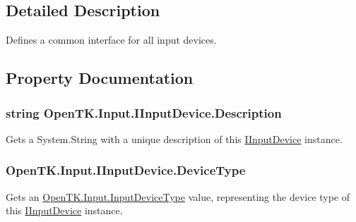 \subsection{Detailed Description}
Defines a common interface for all input devices. 



\subsection{Property Documentation}
\hypertarget{interface_open_t_k_1_1_input_1_1_i_input_device_ae119526b3cf39957b3f0440cf50122f2}{
\subsubsection[{Description}]{\setlength{\rightskip}{0pt plus 5cm}string Open\-T\-K.\-Input.\-I\-Input\-Device.\-Description\hspace{0.3cm}{\ttfamily [get]}}}\label{interface_open_t_k_1_1_input_1_1_i_input_device_ae119526b3cf39957b3f0440cf50122f2}


Gets a System.\-String with a unique description of this \hyperlink{interface_open_t_k_1_1_input_1_1_i_input_device}{I\-Input\-Device} instance. 

\hypertarget{interface_open_t_k_1_1_input_1_1_i_input_device_a5be985412e36d169ff3cf4902eb6b2f3}{
\subsubsection[{Device\-Type}]{ Open\-T\-K.\-Input.\-I\-Input\-Device.\-Device\-Type\hspace{0.3cm}{\ttfamily [get]}}}\label{interface_open_t_k_1_1_input_1_1_i_input_device_a5be985412e36d169ff3cf4902eb6b2f3}


Gets an \hyperlink{namespace_open_t_k_1_1_input_a1d147c6256b0adaa5288eec90ed93270}{Open\-T\-K.\-Input.\-Input\-Device\-Type} value, representing the device type of this \hyperlink{interface_open_t_k_1_1_input_1_1_i_input_device}{I\-Input\-Device} instance. 

